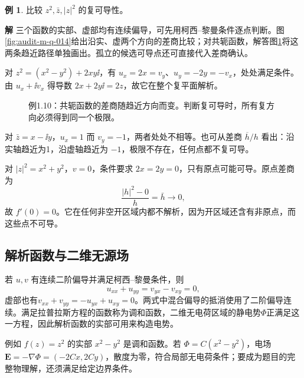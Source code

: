 \documentclass[11pt,openany,fontset=fandol]{ctexbook}
\theoremstyle{plain}\newtheorem{theorem}{定理}[chapter]\newtheorem{proposition}[theorem]{命题}
\theoremstyle{definition}\newtheorem{definition}{定义}[chapter]\newtheorem{example}{例}[chapter]
\theoremstyle{remark}\newtheorem*{remark}{说明}
\newcommand{\SolutionStart}{\par\nobreak\medskip\nobreak\noindent\textbf{解}\quad\ignorespaces}
\newenvironment{solution}{\SolutionStart}{\par\medskip}
\newcommand{\vct}[1]{\bm{#1}}\newcommand{\Rea}{\operatorname{Re}}\newcommand{\Ima}{\operatorname{Im}}
\begin{document}
\begin{example}
比较 $z^2,\bar z,|z|^2$ 的复可导性。
\end{example}

\begin{solution}
三个函数的实部、虚部均有连续偏导，可先用柯西--黎曼条件逐点判断。图\ref{fig:audit-m-q-014}给出沿实、虚两个方向的差商比较；对共轭函数，解答图\ref{fig:eg-1-10}将这两条趋近路径单独画出。孤立的候选可导点还可直接代入差商确认。

对 $z^2=(x^2-y^2)+2xy\ii$，有 $u_x=2x=v_y$、$u_y=-2y=-v_x$，处处满足条件。由 $u_x+\ii v_x$ 得导数 $2x+2y\ii=2z$，故它在整个复平面解析。

\begin{figure}[H]\centering
{}
\caption{例1.10：共轭函数的差商随趋近方向而变。判断复可导时，所有复方向必须得到同一个极限。}\label{fig:eg-1-10}
\end{figure}

对 $\bar z=x-\ii y$，$u_x=1$ 而 $v_y=-1$，两者处处不相等。也可从差商 $\overline h/h$ 看出：沿实轴趋近为1，沿虚轴趋近为 $-1$，极限不存在，任何点都不复可导。

对 $|z|^2=x^2+y^2$，$v=0$，条件要求 $2x=2y=0$，只有原点可能可导。原点差商为
\[
\frac{|h|^2-0}{h}=\bar h\longrightarrow0,
\]
故 $f'(0)=0$。它在任何非空开区域内都不解析，因为开区域还含有非原点，而这些点不可导。

\end{solution}

\subsection{解析函数与二维无源场}
若 $u,v$ 有连续二阶偏导并满足柯西--黎曼条件，则
\[
u_{xx}+u_{yy}=v_{yx}-v_{xy}=0,
\]
虚部也有$v_{xx}+v_{yy}=-u_{yx}+u_{xy}=0$。两式中混合偏导的抵消使用了二阶偏导连续。满足拉普拉斯方程的函数称为调和函数，二维无电荷区域的静电势$\Phi$正满足这一方程，因此解析函数的实部可用来构造电势。

例如 $f(z)=z^2$ 的实部 $x^2-y^2$ 是调和函数。若 $\Phi=C(x^2-y^2)$，电场 $\vct E=-\nabla\Phi=(-2Cx,2Cy)$，散度为零，符合局部无电荷条件；要成为题目的完整物理解，还须满足给定边界条件。
\end{document}

